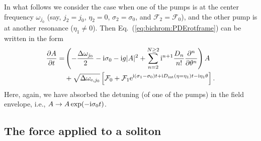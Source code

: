 In what follows we consider the case when one of the pumps is at the center frequency $\omega_{j_0}$ (say, $j_2 = j_0$, $\eta_2 = 0$, $\sigma_2 = \sigma_0$, and $\mathcal{F}_2 = \mathcal{F}_0$), and the other pump is at another resonance ($\eta_1 \ne 0$).  Then  Eq.~(\ref{eq:bichrom:PDErotframe}) can be written in the form
%
\begin{align}\label{eq:bichrom:P1Center}
\frac{\partial A}{\partial t} = & \left( -\frac{\Delta \omega_{j_0}}{2} -\mathrm{i} \sigma_0 -\mathrm{i} g |A|^2 + \sum_{n=2}^{N \ge 2} \mathrm{i}^{n+1} \frac{D_n}{n!}\frac{\partial^n}{\partial\theta^n} \right) A \nonumber \\
& + \sqrt{\Delta\omega_{\mathrm{e},j_0}} \left[ \mathcal{F}_0 + \mathcal{F}_1 \mathrm{e}^{ \mathrm{i} (\sigma_1-\sigma_0)t + \mathrm{i} D_\mathrm{int}(\eta = \eta_1) t - \mathrm{i} \eta_1 \theta } \right].
\end{align}
%
Here, again, we have absorbed the detuning (of one of the pumps) in the field envelope, i.e., $A \to A \exp(-\mathrm{i} \sigma_0 t)$.

\subsection{The force applied to a soliton}
\label{sec:solforce}

